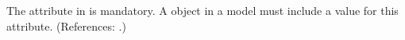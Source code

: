 The attribute  in \Species is mandatory.  A \Species
object in a model must include a value for this attribute.  (References:
.)
